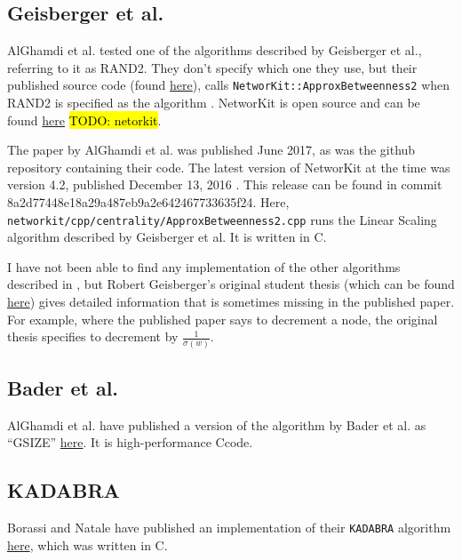 \documentclass[12pt,a4paper,twoside,openright]{report}
\newcommand{\CC}{C\nolinebreak\hspace{-.05em}\raisebox{.4ex}{\tiny\bf +}\nolinebreak\hspace{-.10em}\raisebox{.4ex}{\tiny\bf +}} %
\newcommand{\todo}[1]{\hl{TODO: #1}}
\newcommand{\ttt}[1]{\texttt{#1}}
\begin{document}
\subsection{Geisberger et al.}
AlGhamdi et al. \cite{comparebig} tested one of the algorithms described by Geisberger et al., referring to it as RAND2. They don't specify which one they use, but their published source code (found \href{https://github.com/ecrc/BeBeCA}{here}), calls \ttt{NetworKit::ApproxBetweenness2} when RAND2 is specified as the algorithm \cite{bebecacode}. NetworKit is open source and can be found \href{https://github.com/networkit/networkit}{here} \todo{netorkit}. 

The paper by AlGhamdi et al. was published June 2017, as was the github repository containing their code. The latest version of NetworKit at the time was version 4.2, published December 13, 2016 \cite{networkit}. This release can be found in commit 8a2d77448e18a29a487eb9a2e642467733635f24. Here, \ttt{networkit/cpp/centrality/ApproxBetweenness2.cpp} runs the Linear Scaling algorithm described by Geisberger et al. It is written in \CC.

I have not been able to find any implementation of the other algorithms described in \cite{geisberger}, but Robert Geisberger's original student thesis (which can be found \href{https://www.yumpu.com/en/document/view/16871703/better-approximation-of-betweenness-centrality-computer-science}{here}) gives detailed information that is sometimes missing in the published paper. For example, where the published paper says to decrement a node, the original thesis specifies to decrement by $\frac{1}{\sigma(w)}$.

\subsection{Bader et al.}

AlGhamdi et al. \cite{comparebig} have published a version of the algorithm by Bader et al. as ``GSIZE'' \href{https://github.com/ecrc/BeBeCA/blob/master/Source_Code/src/_bc.cc}{here}. It is high-performance \CC code.

\subsection{KADABRA}

Borassi and Natale have published an implementation of their \ttt{KADABRA} algorithm \href{https://github.com/natema/kadabra}{here}, which was written in \CC.
\end{document}
